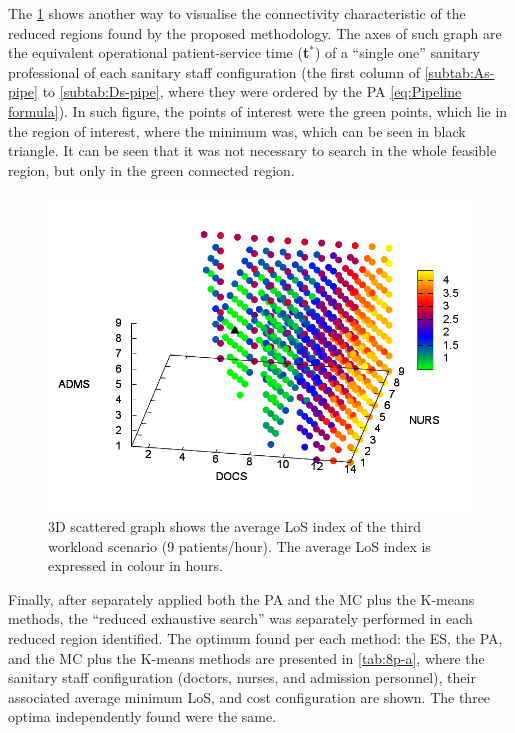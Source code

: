 The \ref{fig:3D-scattered-graph-50} shows another way to visualise
the connectivity characteristic of the reduced regions found by the
proposed methodology. The axes of such graph are the equivalent operational
patient-service time ({\bf t$^*$}) of a ``single
one'' sanitary professional of each sanitary staff configuration
(the first column of \ref{subtab:As-pipe} to \ref{subtab:Ds-pipe},
where they were ordered by the PA \ref{eq:Pipeline formula}). In
such figure, the points of interest were the green points, which lie
in the region of interest, where the minimum was, which can be seen
in black triangle. It can be seen that it was not necessary to search
in the whole feasible region, but only in the green connected region.
\begin{figure}[H]
\noindent \begin{centering}
\includegraphics[width=0.95\columnwidth,height=0.2\paperheight]{figs4/v0/6400-602-50-3D-scatter-LoS2}
\par\end{centering}

\caption{3D scattered graph shows the average LoS index of the third workload
scenario (9 patients/hour). The average LoS index is expressed in
colour in hours.\label{fig:3D-scattered-graph-50}}
\end{figure}


Finally, after separately applied both the PA and the MC plus the
K-means methods, the \textquotedblleft{}reduced exhaustive search\textquotedblright{}
was separately performed in each reduced region identified. The optimum
found per each method: the ES, the PA, and the MC plus the K-means
methods are presented in \ref{tab:8p-a}, where the sanitary staff
configuration (doctors, nurses, and admission personnel), their associated
average minimum LoS, and cost configuration are shown. The three optima
 independently found were the same. 


